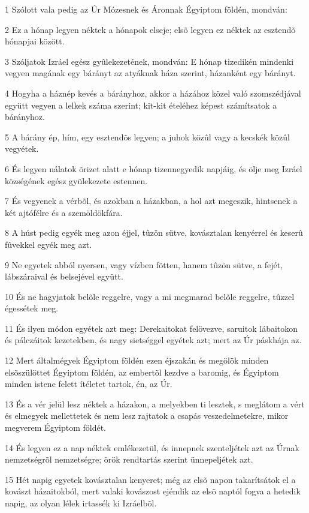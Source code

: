 \par 1 Szólott vala pedig az Úr Mózesnek és Áronnak Égyiptom földén, mondván:
\par 2 Ez a hónap legyen néktek a hónapok elseje; elsõ legyen ez néktek az esztendõ hónapjai között.
\par 3 Szóljatok Izráel egész gyûlekezetének, mondván: E hónap tizedikén mindenki vegyen magának egy bárányt az atyáknak háza szerint, házanként egy bárányt.
\par 4 Hogyha a háznép kevés a bárányhoz, akkor a házához közel való szomszédjával együtt vegyen a lelkek száma szerint; kit-kit ételéhez képest számítsatok a bárányhoz.
\par 5 A bárány ép, hím, egy esztendõs legyen; a juhok közûl vagy a kecskék közûl vegyétek.
\par 6 És legyen nálatok õrizet alatt e hónap tizennegyedik napjáig, és ölje meg Izráel községének egész gyülekezete estennen.
\par 7 És vegyenek a vérbõl, és azokban a házakban, a hol azt megeszik, hintsenek a két ajtófélre és a szemöldökfára.
\par 8 A húst pedig egyék meg azon éjjel, tûzön sütve, kovásztalan kenyérrel és keserû fûvekkel egyék meg azt.
\par 9 Ne egyetek abból nyersen, vagy vízben fõtten, hanem tûzön sütve, a fejét, lábszáraival és belsejével együtt.
\par 10 És ne hagyjatok belõle reggelre, vagy a mi megmarad belõle reggelre, tûzzel égessétek meg.
\par 11 És ilyen módon egyétek azt meg: Derekaitokat felövezve, saruitok lábaitokon és pálczáitok kezetekben, és nagy sietséggel egyétek azt; mert az Úr páskhája az.
\par 12 Mert általmégyek Égyiptom földén ezen éjszakán és megölök minden elsõszülöttet Égyiptom földén, az embertõl kezdve a baromig, és Égyiptom minden istene felett ítéletet tartok, én, az Úr.
\par 13 És a vér jelül lesz néktek a házakon, a melyekben ti lesztek, s meglátom a vért és elmegyek mellettetek és nem lesz rajtatok a csapás veszedelmetekre, mikor megverem Égyiptom földét.
\par 14 És legyen ez a nap néktek emlékezetül, és innepnek szenteljétek azt az Úrnak nemzetségrõl nemzetségre; örök rendtartás szerint ünnepeljétek azt.
\par 15 Hét napig egyetek kovásztalan kenyeret; még az elsõ napon takarítsátok el a kovászt házaitokból, mert valaki kovászost ejéndik az elsõ naptól fogva a hetedik napig, az olyan lélek irtassék ki Izráelbõl.
